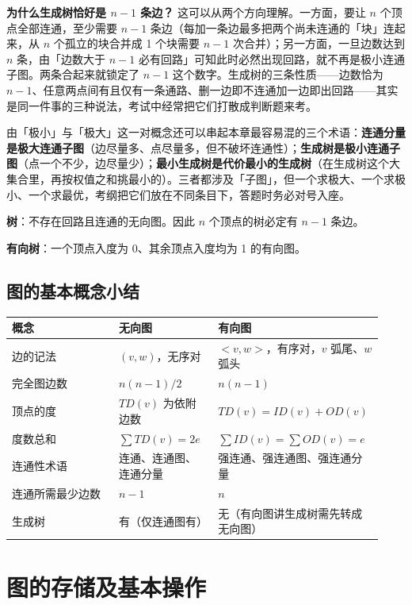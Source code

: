 \documentclass[11pt,openany,UTF8]{ctexbook}
\begin{document}
\textbf{为什么生成树恰好是 $n-1$ 条边？} 这可以从两个方向理解。一方面，要让 $n$ 个顶点全部连通，至少需要 $n-1$ 条边（每加一条边最多把两个尚未连通的「块」连起来，从 $n$ 个孤立的块合并成 1 个块需要 $n-1$ 次合并）；另一方面，一旦边数达到 $n$ 条，由「边数大于 $n-1$ 必有回路」可知此时必然出现回路，就不再是极小连通子图。两条合起来就锁定了 $n-1$ 这个数字。生成树的三条性质——边数恰为 $n-1$、任意两点间有且仅有一条通路、删一边即不连通加一边即出回路——其实是同一件事的三种说法，考试中经常把它们打散成判断题来考。

由「极小」与「极大」这一对概念还可以串起本章最容易混的三个术语：\textbf{连通分量是极大连通子图}（边尽量多、点尽量多，但不破坏连通性）；\textbf{生成树是极小连通子图}（点一个不少，边尽量少）；\textbf{最小生成树是代价最小的生成树}（在生成树这个大集合里，再按权值之和挑最小的）。三者都涉及「子图」，但一个求极大、一个求极小、一个求最优，考纲把它们放在不同条目下，答题时务必对号入座。

\textbf{树}：不存在回路且连通的无向图。因此 $n$ 个顶点的树必定有 $n-1$ 条边。

\textbf{有向树}：一个顶点入度为 0、其余顶点入度均为 1 的有向图。

\subsection{图的基本概念小结}

\begingroup\small\setlength{\tabcolsep}{4.0pt}
\begin{longtable}{@{}L{0.2876\linewidth}L{0.2629\linewidth}L{0.3780\linewidth}@{}}
\toprule
\textbf{概念} & \textbf{无向图} & \textbf{有向图} \\
\midrule
\endhead
边的记法 & $(v,w)$，无序对 & $<v,w>$，有序对，$v$ 弧尾、$w$ 弧头 \\
完全图边数 & $n(n-1)/2$ & $n(n-1)$ \\
顶点的度 & $TD(v)$ 为依附边数 & $TD(v)=ID(v)+OD(v)$ \\
度数总和 & $\sum TD(v)=2e$ & $\sum ID(v)=\sum OD(v)=e$ \\
连通性术语 & 连通、连通图、连通分量 & 强连通、强连通图、强连通分量 \\
连通所需最少边数 & $n-1$ & $n$ \\
生成树 & 有（仅连通图有） & 无（有向图讲生成树需先转成无向图） \\
\bottomrule
\end{longtable}
\endgroup

\section{图的存储及基本操作}
\end{document}
